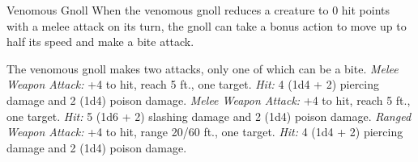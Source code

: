 \documentclass[10pt,a4paper,twoside,twocolumn,openany,bg=print,nodeprecatedcode]{dndbook}
\begin{document}
\begin{DndMonster}[float*=t]{Venomous Gnoll}
\DndMonsterBasics[
armor-class = {13 (natural armor)},
hit-points = {\DndDice{6d8 + 6}},
speed = {30 ft.}
]
\DndMonsterAbilityScores[
 str = 12,
 dex = 14,
 con = 13,
 int = 6,
 wis = 13,
 cha = 7
]
\DndMonsterDetails[
saving-throws = {Con +3},
skills = {Stealth +4},
damage-resistances = {poison},
senses = {darkvision 60 ft., passive perception 11},
languages = {Gnoll},
challenge = 1,
]
When the venomous gnoll reduces a creature to 0 hit points with a melee attack on its turn, the gnoll can take a bonus action to move up to half its speed and make a bite attack.
\par
{}
The venomous gnoll makes two attacks, only one of which can be a bite.
\textsl{Melee Weapon Attack:} +4 to hit, reach 5 ft., one target. \textsl{Hit:} 4 (1d4 + 2) piercing damage and 2 (1d4) poison damage.
\textsl{Melee Weapon Attack:} +4 to hit, reach 5 ft., one target. \textsl{Hit:} 5 (1d6 + 2) slashing damage and 2 (1d4) poison damage.
\textsl{Ranged Weapon Attack:} +4 to hit, range 20/60 ft., one target. \textsl{Hit:} 4 (1d4 + 2) piercing damage and 2 (1d4) poison damage.
\end{DndMonster}


\clearpage
\end{document}
